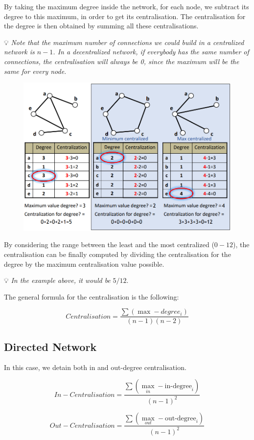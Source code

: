 \documentclass[
  notitlepage,
  onecolumn,
  openany]{book}
\begin{document}
By taking the maximum degree inside the network, for each node, we subtract its degree to this maximum, in order to get its centralisation. The centralisation for the degree is then obtained by summing all these centralisations.

💡 \emph{Note that the maximum number of connections we could build in a centralized network is \(n-1\). In a decentralized network, if everybody has the same number of connections, the centralisation will always be 0, since the maximum will be the same for every node.}

\begin{figure}[h!]

{\centering \includegraphics[width=0.5\linewidth]{images/02-Basic Measures/Untitled} 

}

\end{figure}

By considering the range between the least and the most centralized (\(0-12\)), the centralisation can be finally computed by dividing the centralisation for the degree by the maximum centralisation value possible.

💡 \emph{In the example above, it would be} \(5/12\).

The general formula for the centralisation is the following:

\[
Centralisation = \frac{\sum (\max-degree_i)}{(n-1)(n-2)}
\]

\hypertarget{directed-network-2}{%
\subsection{Directed Network}\label{directed-network-2}}

In this case, we detain both in and out-degree centralisation.

\[
In-Centralisation = \frac{\sum (\max_{in}-\text{in-degree}_i)}{(n-1)^2}
\]

\[
Out-Centralisation = \frac{\sum (\max_{out}-\text{out-degree}_i)}{(n-1)^2}
\]
\end{document}
